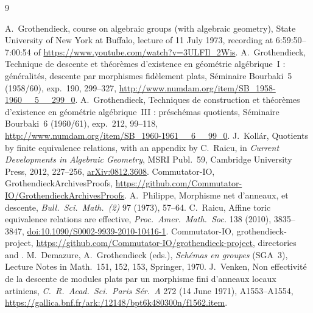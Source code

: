 \documentclass[11pt,a4paper]{amsart}
\theoremstyle{remark}
\begin{document}
\begin{thebibliography}{9}\raggedright
{} A.~Grothendieck, course on algebraic groups (with algebraic geometry), State University of New York at Buffalo, lecture of 11 July 1973, recording at 6:59:50--7:00:54 of \url{https://www.youtube.com/watch?v=3ULFIl_2Wis}.
 A.~Grothendieck, Technique de descente et théorèmes d'existence en géométrie algébrique~I : généralités, descente par morphismes fidèlement plats, Séminaire Bourbaki~5 (1958/60), exp.~190, 299--327, \url{http://www.numdam.org/item/SB_1958-1960__5__299_0}.
 A.~Grothendieck, Techniques de construction et théorèmes d'existence en géométrie algébrique~III : préschémas quotients, Séminaire Bourbaki~6 (1960/61), exp.~212, 99--118, \url{http://www.numdam.org/item/SB_1960-1961__6__99_0}.
 J.~Kollár, Quotients by finite equivalence relations, with an appendix by C.~Raicu, in \emph{Current Developments in Algebraic Geometry}, MSRI Publ.~59, Cambridge University Press, 2012, 227--256, \href{https://arxiv.org/abs/0812.3608}{arXiv:0812.3608}.
 Commutator-IO, GrothendieckArchivesProofs, \url{https://github.com/Commutator-IO/GrothendieckArchivesProofs}.
 A.~Philippe, Morphisme net d'anneaux, et descente, \emph{Bull.\ Sci.\ Math.~(2)} 97 (1973), 57--64.
 C.~Raicu, Affine toric equivalence relations are effective, \emph{Proc.\ Amer.\ Math.\ Soc.} 138 (2010), 3835--3847, \href{https://doi.org/10.1090/S0002-9939-2010-10416-1}{doi:10.1090/S0002-9939-2010-10416-1}.
 Commutator-IO, grothendieck-project, \url{https://github.com/Commutator-IO/grothendieck-project}, directories  and .
 M.~Demazure, A.~Grothendieck (eds.), \emph{Schémas en groupes} (SGA~3), Lecture Notes in Math.~151, 152, 153, Springer, 1970.
 J.~Venken, Non effectivité de la descente de modules plats par un morphisme fini d'anneaux locaux artiniens, \emph{C.\ R.\ Acad.\ Sci.\ Paris Sér.~A} 272 (14 June 1971), A1553--A1554, \url{https://gallica.bnf.fr/ark:/12148/bpt6k480300n/f1562.item}.
\end{thebibliography}
\end{document}
